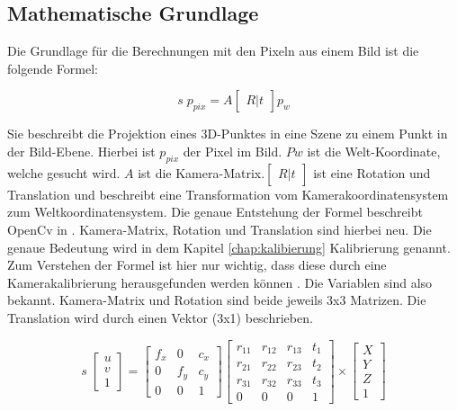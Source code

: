 	\subsection{Mathematische Grundlage}
	Die Grundlage für die Berechnungen mit den Pixeln aus einem Bild ist die folgende Formel:
	
	\begin{equation}
	s \; p_{pix} = A \begin{bmatrix} R|t \end{bmatrix} p_w
	\label{eq:basic_trans}
	\end{equation}
	
	Sie beschreibt die Projektion eines 3D-Punktes in eine Szene zu einem Punkt in der Bild-Ebene. Hierbei ist \( p_{pix} \) der Pixel im Bild. \( Pw \) ist die Welt-Koordinate, welche gesucht wird. \( A \) ist die Kamera-Matrix.\( \begin{bmatrix} R|t \end{bmatrix} \) ist eine Rotation und Translation und beschreibt eine Transformation vom Kamerakoordinatensystem zum Weltkoordinatensystem. Die genaue Entstehung der Formel beschreibt OpenCv in \citep[Vgl.][]{noauthor_opencv_nodate-2}. Kamera-Matrix, Rotation und Translation sind hierbei neu. Die genaue Bedeutung wird in dem Kapitel \ref{chap:kalibierung} Kalibrierung genannt. Zum Verstehen der Formel ist hier nur wichtig, dass diese durch eine Kamerakalibrierung herausgefunden werden können \citep[Vgl.][]{dawson-howe_simple_1994}. Die Variablen sind also bekannt. Kamera-Matrix und Rotation sind beide jeweils 3x3 Matrizen. Die Translation wird durch einen Vektor (3x1) beschrieben. 
	
	\begin{equation}
	s \; \begin{bmatrix}
	u \\ 
	v \\ 
	1
	\end{bmatrix} = \begin{bmatrix}
	f_x & 0 & c_x \\
	0 & f_y & c_y \\
	0 & 0 & 1
	\end{bmatrix} \begin{bmatrix}
	r_{11} & r_{12} & r_{13} & t_1 \\ 
	r_{21} & r_{22} & r_{23} & t_2 \\ 
	r_{31} & r_{32} & r_{33} & t_3 \\
	0 & 0 & 0 & 1
	\end{bmatrix} \times \begin{bmatrix}
	X \\ 
	Y \\ 
	Z \\
	1
	\end{bmatrix}
	\label{eq:basic_trans_complete}
	\end{equation}
	
